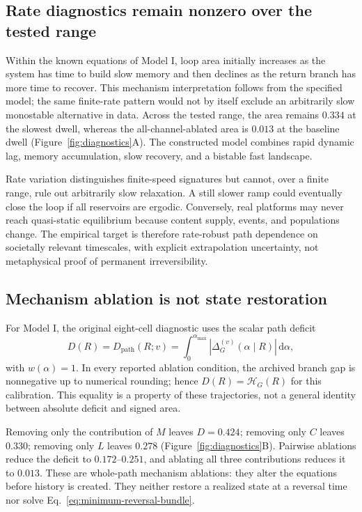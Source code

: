 \documentclass[pdflatex,sn-mathphys-num]{sn-jnl}
\newcommand{\alphamax}{\alpha_{\max}}
\newcommand{\dd}{\mathrm{d}}
\begin{document}
\subsection{Rate diagnostics remain nonzero over the tested range}

Within the known equations of Model I, loop area initially increases as the system has time to build slow memory and then declines as the return branch has more time to recover. This mechanism interpretation follows from the specified model; the same finite-rate pattern would not by itself exclude an arbitrarily slow monostable alternative in data. Across the tested range, the area remains $0.334$ at the slowest dwell, whereas the all-channel-ablated area is $0.013$ at the baseline dwell (Figure~\ref{fig:diagnostics}A). The constructed model combines rapid dynamic lag, memory accumulation, slow recovery, and a bistable fast landscape.

Rate variation distinguishes finite-speed signatures but cannot, over a finite range, rule out arbitrarily slow relaxation. A still slower ramp could eventually close the loop if all reservoirs are ergodic. Conversely, real platforms may never reach quasi-static equilibrium because content supply, events, and populations change. The empirical target is therefore rate-robust path dependence on societally relevant timescales, with explicit extrapolation uncertainty, not metaphysical proof of permanent irreversibility.

\subsection{Mechanism ablation is not state restoration}

For Model I, the original eight-cell diagnostic uses the scalar path deficit
\begin{equation}
D(R)=D_{\mathrm{path}}(R;v)
=\int_0^{\alphamax}
\left|\Delta_G^{(v)}(\alpha\mid R)\right|\,\dd\alpha,
\end{equation}
with $w(\alpha)=1$. In every reported ablation condition, the archived branch gap is nonnegative up to numerical rounding; hence $D(R)=\mathcal H_G(R)$ for this calibration. This equality is a property of these trajectories, not a general identity between absolute deficit and signed area.

Removing only the contribution of $M$ leaves $D=0.424$; removing only $C$ leaves $0.330$; removing only $L$ leaves $0.278$ (Figure~\ref{fig:diagnostics}B). Pairwise ablations reduce the deficit to $0.172$--$0.251$, and ablating all three contributions reduces it to $0.013$. These are whole-path mechanism ablations: they alter the equations before history is created. They neither restore a realized state at a reversal time nor solve Eq.~\eqref{eq:minimum-reversal-bundle}.
\end{document}
